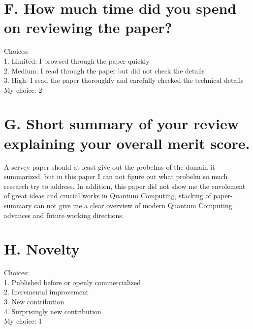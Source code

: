 \documentclass[]{ctexart}
\begin{document}
    \section{F. How much time did you spend on reviewing the paper?}
    \noindent Choices:\\
    \hspace*{2em}1. Limited: I browsed through the paper quickly\\
    \hspace*{2em}2. Medium: I read through the paper but did not check the details\\
    \hspace*{2em}3. High: I read the paper thoroughly and carefully checked the technical details\\
    My choice: 2
    \section{G. Short summary of your review explaining your overall merit score.}
        A servey paper should at least give out the probelms of the domain it summarized, but in this paper I can 
    not figure out what probelm so much research try to address. In addition, this paper did not show me the envolement  
    of great ideas and crucial works in Quantum Computing, stacking of paper-summary can not give me a clear overview of 
    modern Quantum Computing advances and future working directions.
    \section{H. Novelty}
    \noindent Choices:\\
    \hspace*{2em}1. Published before or openly commercialized\\
    \hspace*{2em}2. Incremental improvement\\
    \hspace*{2em}3. New contribution\\
    \hspace*{2em}4. Surprisingly new contribution\\
    My choice: 1
\end{document}
